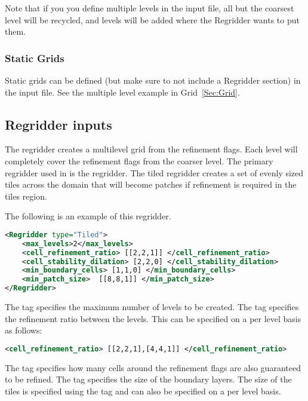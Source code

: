 Note that if you you define multiple levels in the input file, all but
the coarsest level will be recycled, and levels will be added where
the Regridder wants to put them.

\subsubsection{Static Grids}

Static grids can be defined (but make sure to not include a Regridder
section) in the input file. See the multiple level example in
Grid~\ref{Sec:Grid}.

\subsection{Regridder inputs}
The regridder creates a multilevel grid from the refinement flags.
Each level will completely cover the refinement flags from the coarser
level.  The primary regridder used in \Vaango is the  regridder.
The tiled regridder creates a set of evenly sized tiles across the domain
that will become patches if refinement is required in the tiles region.

The following is an example of this regridder.
\begin{lstlisting}[language=XML]
<Regridder type="Tiled">   
    <max_levels>2</max_levels>
    <cell_refinement_ratio> [[2,2,1]] </cell_refinement_ratio>
    <cell_stability_dilation> [2,2,0] </cell_stability_dilation>
    <min_boundary_cells> [1,1,0] </min_boundary_cells>
    <min_patch_size>  [[8,8,1]] </min_patch_size>
</Regridder>
\end{lstlisting}

The  tag specifies the maximum number of levels
to be created.  The  tag specifies the 
refinement ratio between the levels.  This can be specified on a per 
level basis as follows:
\begin{lstlisting}[language=XML]
    <cell_refinement_ratio> [[2,2,1],[4,4,1]] </cell_refinement_ratio>
\end{lstlisting}

The  tag specifies how many cells around
the refinement flags are also guaranteed to be refined.  The
 tag specifies the size of the boundary layers. 
The size of the tiles is specified using the  tag
and can also be specified on a per level basis.

